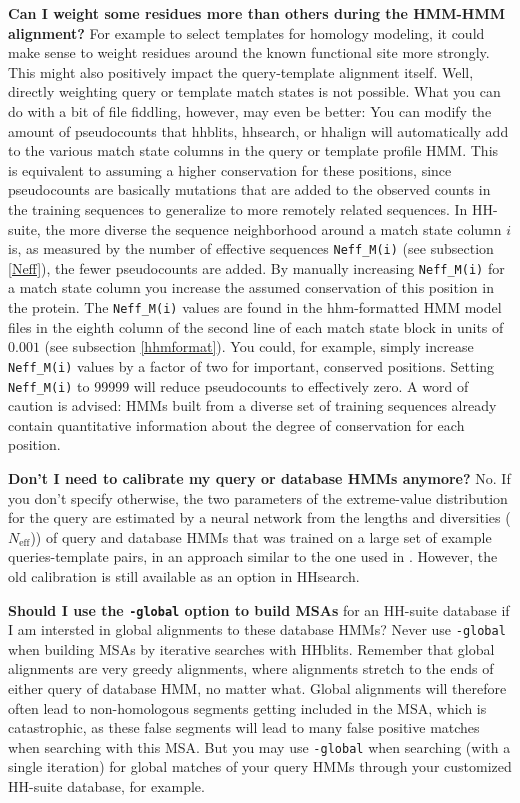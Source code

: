 \documentclass[11pt,a4paper]{article}
\begin{document}
{\bf Can I weight some residues more than others during the HMM-HMM alignment?} For example to select templates for homology modeling, it could make sense to weight residues around the known functional site more strongly. This might also positively impact the query-template alignment itself. Well, directly weighting query or template match states is not possible. What you can do with a bit of file fiddling, however, may even be better: You can modify the amount of pseudocounts that hhblits, hhsearch, or hhalign will automatically add to the various match state columns in the query or template profile HMM. This is equivalent to assuming a higher conservation for these positions, since pseudocounts are basically mutations that are added to the observed counts in the training sequences to generalize to more remotely related sequences. In HH-suite, the more diverse the sequence neighborhood around a match state column $i$ is, as measured by the number of effective sequences \verb`Neff_M(i)` (see subsection \ref{Neff}), the fewer pseudocounts are added. By manually increasing \verb`Neff_M(i)` for a match state column you increase the assumed conservation of this position in the protein. The \verb`Neff_M(i)` values are found in the hhm-formatted HMM model files in the eighth column of the second line of each match state block in units of $0.001$ (see subsection \ref{hhmformat}). You could, for example, simply increase \verb`Neff_M(i)` values by a factor of two for important, conserved positions. Setting \verb`Neff_M(i)` to 99999 will reduce pseudocounts to effectively zero. A word of caution is advised: HMMs built from a diverse set of training sequences already contain quantitative information about the degree of conservation for each position.


{\bf Don't I need to calibrate my query or database HMMs anymore?}
No. If you don't specify otherwise, the two parameters of the extreme-value distribution for the query are estimated by a neural network from the lengths and diversities ($N_\mathrm{eff}$)) of query and database HMMs that was trained on a large set of example queries-template pairs, in an approach similar to the one used in \cite{Sadreyev:2008}. However, the old calibration is still available as an option in HHsearch.

{\bf Should I use the \verb`-global` option to build MSAs} for an HH-suite database if I am intersted in global alignments to these database HMMs?
Never use \verb`-global` when building MSAs by iterative searches with HHblits. Remember that global alignments are very greedy alignments, where alignments stretch to the ends of either query of database HMM, no matter what. Global alignments will therefore often lead to non-homologous segments getting included in the MSA, which is catastrophic, as these false segments will lead to many false positive matches when searching with this MSA. But you may use \verb`-global` when searching (with a single iteration) for global matches of your query HMMs through your customized HH-suite database, for example.
\end{document}
